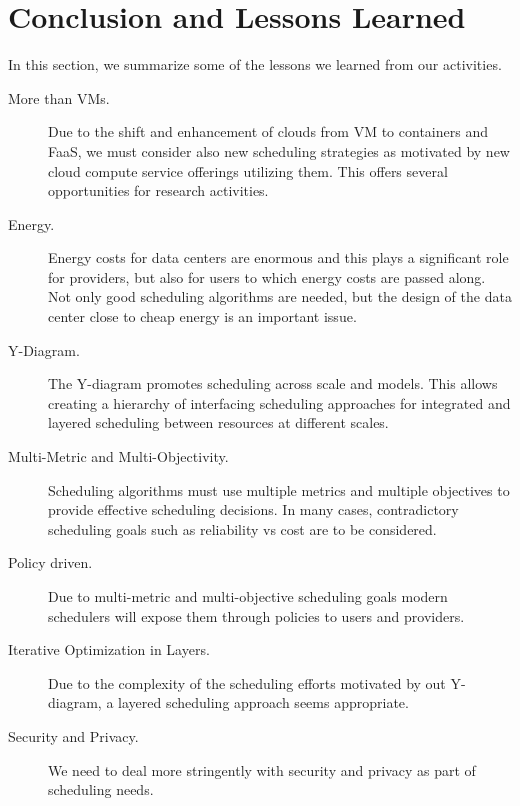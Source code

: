\documentclass[final,5p,times,twocolumn]{elsarticle}
\begin{document}


\section{Conclusion and Lessons Learned}\label{sec:conclusion}



In this section, we summarize some of the lessons we learned from our activities.

\begin{description}

\item[More than VMs.] Due to the shift and enhancement of clouds from VM to containers and FaaS, we must consider also new scheduling strategies as motivated by new cloud compute service offerings utilizing them. This offers several opportunities for research activities.

\item[Energy.] Energy costs for data centers are enormous and this plays a significant role for providers, but also for users to which energy costs are passed along. Not only good scheduling algorithms are needed, but the design of the data center close to cheap energy is an important issue.

\item[Y-Diagram.] The Y-diagram promotes scheduling across scale and models. This allows creating a hierarchy of interfacing scheduling approaches for integrated and layered scheduling between resources at different scales.

\item[Multi-Metric and Multi-Objectivity.] Scheduling algorithms must use multiple metrics and multiple objectives to provide effective scheduling decisions. In many cases, contradictory scheduling goals such as reliability vs cost are to be considered.

\item[Policy driven.] Due to multi-metric and multi-objective scheduling goals modern schedulers will expose them through policies to users and providers.

\item[Iterative Optimization in Layers.] Due to the complexity of the scheduling efforts motivated by out Y-diagram, a layered scheduling approach seems appropriate.

\item[Security and Privacy.] We need to deal more stringently with security and privacy as part of scheduling needs.


\end{description}
\end{document}

